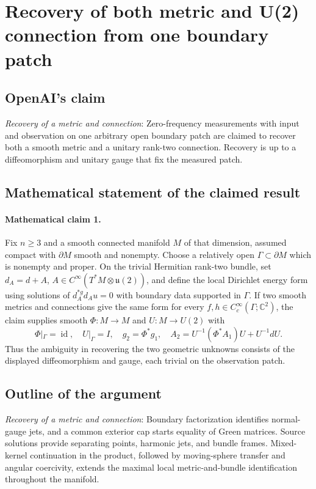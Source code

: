 \documentclass[11pt]{article}
\begin{document}
\section*{Recovery of both metric and U(2) connection from one boundary patch}

\subsection{OpenAI's claim}
\textit{Recovery of a metric and connection}: Zero-frequency measurements with input and observation on one arbitrary open boundary patch are claimed to recover both a smooth metric and a unitary rank-two connection. Recovery is up to a diffeomorphism and unitary gauge that fix the measured patch.

\subsection{Mathematical statement of the claimed result}
\paragraph{Mathematical claim 1.} Fix $n\ge3$ and a smooth connected manifold $M$ of that dimension, assumed compact with $\partial M$ smooth and nonempty. Choose a relatively open $\Gamma\subset\partial M$ which is nonempty and proper. On the trivial Hermitian rank-two bundle, set $d_A=d+A$, $A\in C^\infty(T^*M\otimes\mathfrak u(2))$, and define the local Dirichlet energy form using solutions of $d_A^{*g}d_Au=0$ with boundary data supported in $\Gamma$. If two smooth metrics and connections give the same form for every $f,h\in C_c^\infty(\Gamma;\mathbb C^2)$, the claim supplies smooth $\Phi:M\to M$ and $U:M\to U(2)$ with \[\Phi|_\Gamma=\operatorname{id},\quad U|_\Gamma=I,\quad g_2=\Phi^*g_1,\quad A_2=U^{-1}(\Phi^*A_1)U+U^{-1}dU.\] Thus the ambiguity in recovering the two geometric unknowns consists of the displayed diffeomorphism and gauge, each trivial on the observation patch.

\subsection{Outline of the argument}
\textit{Recovery of a metric and connection}: Boundary factorization identifies normal-gauge jets, and a common exterior cap starts equality of Green matrices. Source solutions provide separating points, harmonic jets, and bundle frames. Mixed-kernel continuation in the product, followed by moving-sphere transfer and angular coercivity, extends the maximal local metric-and-bundle identification throughout the manifold.
\end{document}
